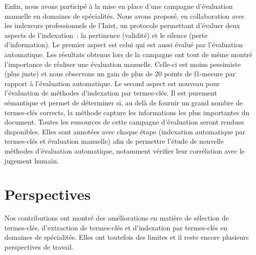     Enfin, nous avons participé à la mise en place d'une campagne d'évaluation
    manuelle en domaines de spécialités. Nous avons proposé, en collaboration
    avec les indexeurs professionnels de l'Inist, un protocole permettant
    d'évaluer deux aspects de l'indexation~: la pertinence (validité) et le
    silence (perte d'information). Le premier aspect est celui qui est aussi
    évalué par l'évaluation automatique. Les résultats obtenus lors de la
    campagne ont tout de même montré l'importance de réaliser une évaluation
    manuelle. Celle-ci est moins pessimiste (plus juste) et nous observons un
    gain de plus de 20 points de f1-mesure par rapport à l'évaluation
    automatique. Le second aspect est nouveau pour
    l'évaluation de méthodes d'indexation par termes-clés. Il est purement
    sémantique et permet de déterminer si, au delà de fournir un grand nombre de
    termes-clés corrects, la méthode capture les informations les plus
    importantes du document. Toutes les ressources de cette campagne
    d'évaluation seront rendues disponibles. Elles sont annotées avec
    chaque étape (indexation automatique par termes-clés et évaluation manuelle)
    afin de permettre l'étude de nouvelle méthodes d'évaluation automatique,
    notamment vérifier leur corrélation avec le jugement humain.

  \section{Perspectives}
  \label{sec:main-conclusion-contributions}
    Nos contributions ont montré des améliorations en matière de sélection de
    termes-clés, d'extraction de termes-clés et d'indexation par termes-clés en
    domaines de spécialités. Elles ont toutefois des limites et il reste encore
    plusieurs perspectives de travail.

